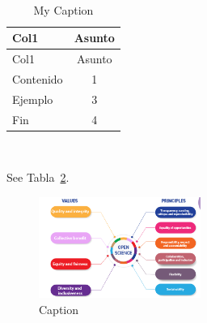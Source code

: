 \documentclass[
  letterpaper,
  DIV=11,
  numbers=noendperiod]{scrreprt}
\begin{document}
\begin{table}

\begin{minipage}[t]{0.33\linewidth}

{\centering 

~

}

\end{minipage}%
%
\begin{minipage}[t]{0.33\linewidth}

{\centering 

\begin{longtable}[]{@{}lc@{}}
\caption{\label{tbl-letters}My Caption}\tabularnewline
\toprule\noalign{}
Col1 & Asunto \\
\midrule\noalign{}
\endfirsthead
\toprule\noalign{}
Col1 & Asunto \\
\midrule\noalign{}
\endhead
\bottomrule\noalign{}
\endlastfoot
Contenido & 1 \\
Ejemplo & 3 \\
Fin & 4 \\
\end{longtable}

}

\end{minipage}%
%
\begin{minipage}[t]{0.33\linewidth}

{\centering 

~

}

\end{minipage}%

\end{table}

See Tabla~\ref{tbl-letters}.

\begin{figure}

{\centering \includegraphics[width=2.08333in,height=\textheight]{capitulos/cap1/images/Captura de pantalla 2024-05-11 020540.png}

}

\caption{Caption}

\end{figure}
\end{document}
